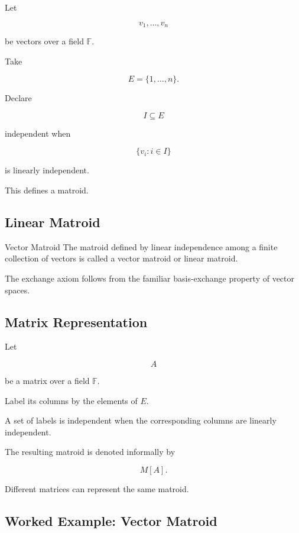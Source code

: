 Let

\[
v_1,\ldots,v_n
\]

be vectors over a field \(\mathbb{F}\).

Take

\[
E=\{1,\ldots,n\}.
\]

Declare

\[
I\subseteq E
\]

independent when

\[
\{v_i:i\in I\}
\]

is linearly independent.

This defines a matroid.

\subsection{Linear Matroid}
\label{subsec:linear-matroid}

\begin{definitionbox}{Vector Matroid}
The matroid defined by linear independence among a finite collection of
vectors is called a vector matroid or linear matroid.
\end{definitionbox}

The exchange axiom follows from the familiar basis-exchange property of
vector spaces.

\subsection{Matrix Representation}
\label{subsec:matroid-matrix-representation}

Let

\[
A
\]

be a matrix over a field \(\mathbb{F}\).

Label its columns by the elements of \(E\).

A set of labels is independent when the corresponding columns are
linearly independent.

The resulting matroid is denoted informally by

\[
\boxed{
M[A].
}
\]

Different matrices can represent the same matroid.

\subsection{Worked Example: Vector Matroid}
\label{subsec:worked-vector-matroid}

